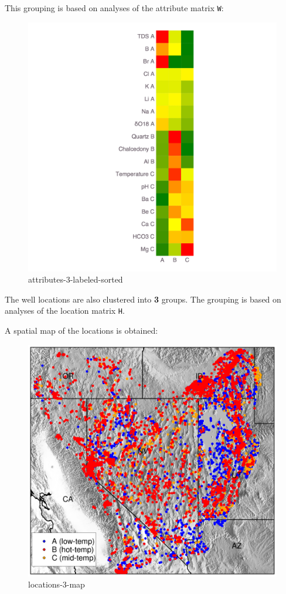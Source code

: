 \documentclass[11pt]{article}
\begin{document}
    This grouping is based on analyses of the attribute matrix \texttt{W}:

\begin{figure}
\centering
\includegraphics{../figures-postprocessing-nl-640/attributes-3-labeled-sorted.png}
\caption{attributes-3-labeled-sorted}
\end{figure}

The well locations are also clustered into \textbf{3} groups. The
grouping is based on analyses of the location matrix \texttt{H}.

A spatial map of the locations is obtained:

\begin{figure}
\centering
\includegraphics{../maps-results-postprocessing-nl-640/locations-3.png}
\caption{locations-3-map}
\end{figure}
\end{document}
